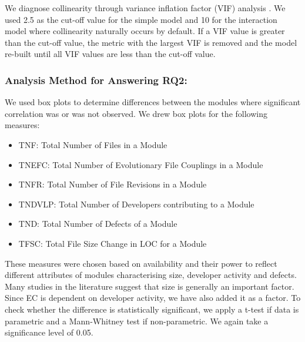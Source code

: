 \documentclass[times]{smrauth}
\begin{document}



We diagnose collinearity through variance inflation factor (VIF) analysis \cite{montgomery2012introduction}. We used 2.5 as the cut-off value for the simple model and 10 for the interaction model where collinearity naturally occurs by default. If a VIF value is greater than the cut-off value, the metric with the largest VIF is removed and the model re-built until all VIF values are less than the cut-off value.

\subsubsection{Analysis Method for Answering RQ2: }

We used box plots to determine differences between the modules where significant correlation was or was not observed. We drew box plots for the following measures:

\begin{itemize}
\renewcommand{\labelitemi}{$\bullet$}
\item TNF: 	 Total Number of Files in a Module
\item TNEFC: Total Number of Evolutionary File Couplings in a Module
\item TNFR:  Total Number of File Revisions in a Module
\item TNDVLP: Total Number of Developers contributing to a Module
\item TND:   Total Number of Defects of a Module
\item TFSC:  Total File Size Change in LOC for a Module
\end{itemize}

These measures were chosen based on availability and their power to reflect different attributes of modules characterising size, developer activity and defects. Many studies in the literature suggest that size is generally an important factor. Since EC is dependent on developer activity, we have also added it as a factor. To check whether the difference is statistically significant, we apply a t-test if data is parametric and a Mann-Whitney test if non-parametric. We again take a significance level of 0.05.
\end{document}
